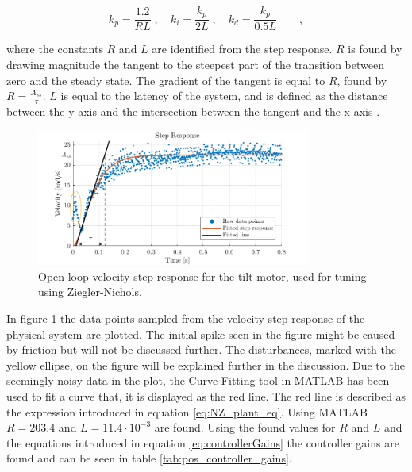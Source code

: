 \documentclass[../../main.tex]{subfiles}
\begin{document}
\begin{equation}
k_p = \frac{1.2}{RL}\;, \quad k_i = \frac{k_p}{2L}\;, \quad k_d = \frac{k_p}{0.5L} \qquad ,
\label{eq:controllerGains}
\end{equation}

where the constants $R$ and $L$ are identified from the step response. $R$ is found by drawing magnitude the tangent to the steepest part of the transition between zero and the steady state. The gradient of the tangent is equal to $R$, found by $R = \frac{A_{ss}}{\tau}$. $L$ is equal to the latency of the system, and is defined as the distance between the y-axis and the intersection between the tangent and the x-axis \cite{Ziegler-Nichols}. 



\begin{figure}
    \centering
    \includegraphics[width = 0.8\textwidth]{Sections/System_Design/Images/Ziegler-Nichols_Stepresponse_anno.png}
    \caption{Open loop velocity step response for the tilt motor, used for tuning using Ziegler-Nichols.}
    \label{fig:stepPlantNZ}
\end{figure}

In figure \ref{fig:stepPlantNZ} the data points sampled from the velocity step response of the physical system are plotted. The initial spike seen in the figure might be caused by friction but will not be discussed further. The disturbances, marked with the yellow ellipse, on the figure will be explained further in the discussion. Due to the seemingly noisy data in the plot, the Curve Fitting tool in MATLAB has been used to fit a curve that, it is displayed as the red line. The red line is described as the expression introduced in equation \ref{eq:NZ_plant_eq}. Using MATLAB $R = 203.4 $ and $L = 11.4 \cdot 10^{-3}$ are found. Using the found values for $R$ and $L$ and the equations introduced in equation \ref{eq:controllerGains} the controller gains are found and can be seen in table \ref{tab:pos_controller_gains}.
\end{document}
